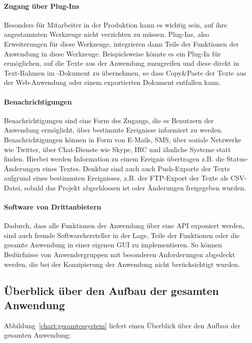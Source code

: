\paragraph{Zugang über Plug-Ins} Besonders für Mitarbeiter in der Produktion kann es wichtig sein, auf ihre angestammten Werkzeuge nicht verzichten zu müssen. Plug-Ins, also Erweiterungen für diese Werkzeuge, integrieren dann Teile der Funktionen der Anwendung in diese Werkzeuge. Beispielsweise könnte es ein Plug-In für  ermöglichen, auf die Texte aus der Anwendung zuzugreifen und diese direkt in Text-Rahmen im -Dokument zu übernehmen, so dass Copy\&Paste der Texte aus der Web-Anwendung oder einem exportierten Dokument entfallen kann.

\paragraph{Benachrichtigungen} Benachrichtigungen sind eine Form des Zugangs, die es Benutzern der Anwendung ermöglicht, über bestimmte Ereignisse informiert zu werden. Benachrichtigungen können in Form von E-Mails, SMS, über soziale Netzwerke wie Twitter, über Chat-Dienste wie Skype, IRC und ähnliche Systeme statt finden. Hierbei werden Information zu einem Ereignis übertragen z.B. die Status-Änderungen eines Textes. Denkbar sind auch auch Push-Exporte der Texte aufgrund eines bestimmten Ereignisses, z.B. der FTP-Export der Texte als CSV-Datei, sobald das Projekt abgschlossen ist oder Änderungen freigegeben wurden.

\paragraph{Software von Drittanbietern} Dadurch, dass alle Funktionen der Anwendung über eine API exponiert werden, sind auch fremde Softwarehersteller in der Lage, Teile der Funktionen oder die gesamte Anwendung in einer eigenen GUI zu implementieren. So können Bedürfnisse von Anwendergruppen mit besonderen Anforderungen abgedeckt werden, die bei der Konzipierung der Anwendung nicht berücksichtigt wurden.

\pagebreak

\subsection{Überblick über den Aufbau der gesamten Anwendung}

Abbildung~\ref{chart:gesamtessystem} liefert einen Überblick über den Aufbau der gesamten Anwendung:

